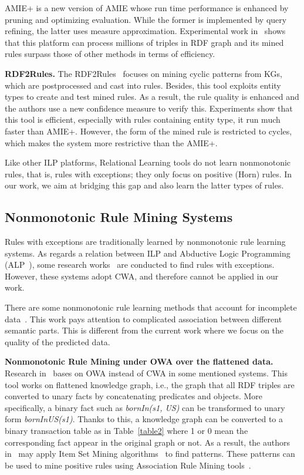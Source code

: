 AMIE+ is a new version of AMIE whose run time performance is enhanced by pruning and optimizing evaluation. While the former is implemented by query refining, the latter uses measure approximation. Experimental work in~\cite{ref10} shows that this platform can process millions of triples in RDF graph and its mined rules surpass those of other methods in terms of efficiency.

\textbf{RDF2Rules.} The RDF2Rules~\cite{ref29} focuses on mining cyclic patterns from KGs, which are postprocessed and cast into rules. Besides, this tool exploits entity types to create and test mined rules. As a result, the rule quality is enhanced and the authors use a new confidence measure to verify this. Experiments show that this tool is efficient, especially with rules containing entity type, it run much faster than AMIE+. However, the form of the mined rule is restricted to cycles, which makes the system more restrictive than the AMIE+.

Like other ILP platforms, Relational Learning tools do not learn nonmonotonic rules, that is, rules with exceptions; they only focus on positive (Horn) rules. In our work, we aim at bridging this gap and also learn the latter types of rules.

\subsection{Nonmonotonic Rule Mining Systems}
\label{related-work-nonmonotonic-rule-mining-systems}

Rules with exceptions are traditionally learned by nonmonotonic rule learning systems. As regards a relation between ILP and Abductive Logic Programming (ALP~\cite{ref31}), some research works~\cite{ref11, ref32, ref33} are conducted to find rules with exceptions. However, these systems adopt CWA, and therefore cannot be applied in our work.

There are some nonmonotonic rule learning methods that account for incomplete data~\cite{ref34}. This work pays attention to complicated association between different semantic parts. This is different from the current work where we focus on the quality of the predicted data.

\textbf{Nonmonotonic Rule Mining under OWA over the flattened data.} Research in~\cite{ref12} bases on OWA instead of CWA in some mentioned systems. This tool works on flattened knowledge graph, i.e., the graph that all RDF triples are converted to unary facts by concatenating predicates and objects. More specifically, a binary fact such as \textit{bornIn(s1, US)} can be transformed to unary form \textit{bornInUS(s1)}. Thanks to this, a knowledge graph can be converted to a binary transaction table as in Table~\ref{table2} where 1 or 0 mean the corresponding fact appear in the original graph or not. As a result, the authors in~\cite{ref12} may apply Item Set Mining algorithms~\cite{ref37} to find patterns. These patterns can be used to mine positive rules using Association Rule Mining tools~\cite{ref13}.

